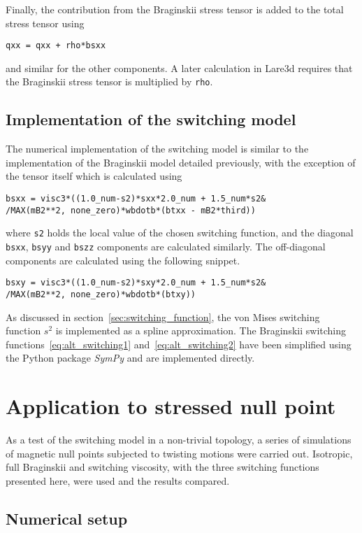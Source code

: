 Finally, the contribution from the Braginskii stress tensor is added to the total stress tensor using 
\begin{lstlisting}
qxx = qxx + rho*bsxx
\end{lstlisting}
and similar for the other components. A later calculation in Lare3d requires that the Braginskii stress tensor is multiplied by \verb|rho|.

\subsection{Implementation of the switching model}

The numerical implementation of the switching model is similar to the implementation of the Braginskii model detailed previously, with the exception of the tensor itself which is calculated using
\begin{lstlisting}
bsxx = visc3*((1.0_num-s2)*sxx*2.0_num + 1.5_num*s2&
/MAX(mB2**2, none_zero)*wbdotb*(btxx - mB2*third))
\end{lstlisting}
where \verb|s2| holds the local value of the chosen switching function, and the diagonal \verb|bsxx|, \verb|bsyy| and \verb|bszz| components are calculated similarly. The off-diagonal components are calculated using the following snippet.
\begin{lstlisting}
bsxy = visc3*((1.0_num-s2)*sxy*2.0_num + 1.5_num*s2&
/MAX(mB2**2, none_zero)*wbdotb*(btxy))
\end{lstlisting}

As discussed in section~\ref{sec:switching_function}, the von Mises switching function $s^2$ is implemented as a spline approximation. The Braginskii switching functions~\eqref{eq:alt_switching1} and~\eqref{eq:alt_switching2} have been simplified using the Python package \emph{SymPy} and are implemented directly. 

\section{Application to stressed null point}

\label{sec:slow_null_point}

As a test of the switching model in a non-trivial topology, a series of simulations of magnetic null points subjected to twisting motions were carried out. Isotropic, full Braginskii and switching viscosity, with the three switching functions presented here, were used and the results compared.

\subsection{Numerical setup}

